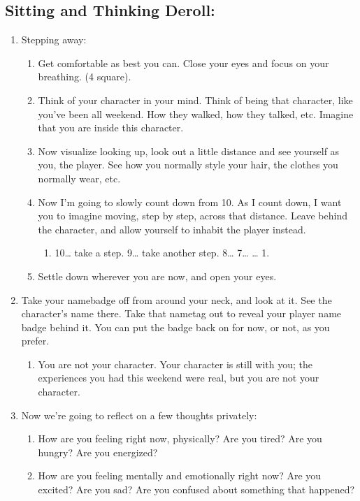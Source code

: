 \documentclass[green]{GL2020}
\begin{document}
\subsection*{Sitting and Thinking Deroll:}
\begin{enumerate}
	\item Stepping away:
	\begin{enumerate}
		\item Get comfortable as best you can. Close your eyes and focus on your breathing. (4 square).
		\item Think of your character in your mind. Think of being that character, like you’ve been all weekend. How they walked, how they talked, etc. Imagine that you are inside this character.
		\item Now visualize looking up, look out a little distance and see yourself as you, the player. See how you normally style your hair, the clothes you normally wear, etc.
		\item Now I’m going to slowly count down from 10. As I count down, I want you to imagine moving, step by step, across that distance. Leave behind the character, and allow yourself to inhabit the player instead.
		\begin{enumerate}
			\item 10… take a step. 9… take another step. 8… 7… … 1.
		\end{enumerate}
		\item Settle down wherever you are now, and open your eyes.
	\end{enumerate}
	\item Take your namebadge off from around your neck, and look at it. See the character’s name there. Take that nametag out to reveal your player name badge behind it. You can put the badge back on for now, or not, as you prefer.
	\begin{enumerate}
		\item You are not your character. Your character is still with you; the experiences you had this weekend were real, but you are not your character.
	\end{enumerate}
	\item Now we’re going to reflect on a few thoughts privately:
	\begin{enumerate}
		\item How are you feeling right now, physically? Are you tired? Are you hungry? Are you energized?
		\item How are you feeling mentally and emotionally right now? Are you excited? Are you sad? Are you confused about something that happened?

\end{enumerate}
\end{enumerate}
\end{document}
